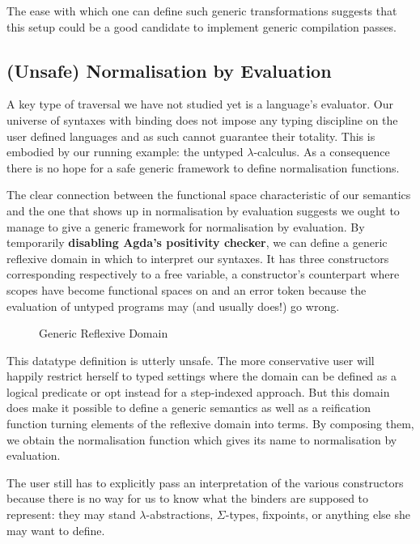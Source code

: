 The ease with which one can define such generic transformations
suggests that this setup could be a good candidate to implement
generic compilation passes.

\subsection{(Unsafe) Normalisation by Evaluation}

A key type of traversal we have not studied yet is a language's
evaluator. Our universe of syntaxes with binding does not impose
any typing discipline on the user defined languages and as such
cannot guarantee their totality. This is embodied by our running
example: the untyped $\lambda$-calculus. As a consequence there
is no hope for a safe generic framework to define normalisation
functions.

The clear connection between the  functional space
characteristic of our semantics and the one that shows up in
normalisation by evaluation suggests we ought to manage to
give a generic framework for normalisation by evaluation.
By temporarily \textbf{disabling Agda's positivity checker},
we can define a generic reflexive domain  in which to
interpret our syntaxes. It has three constructors corresponding
respectively to a free variable, a constructor's counterpart where
scopes have become  functional spaces on  and
an error token because the evaluation of untyped programs may
(and usually does!) go wrong.

\begin{figure}[h]
{\center {}}
\caption{Generic Reflexive Domain}
\end{figure}

This datatype definition is utterly unsafe. The more conservative
user will happily restrict herself to typed settings where the
domain can be defined as a logical predicate or opt instead for
a step-indexed approach. But this domain does make it possible
to define a generic  semantics as well as a reification
function turning elements of the reflexive domain into terms.
By composing them, we obtain the normalisation function which
gives its name to normalisation by evaluation.

The user still has to explicitly pass an interpretation of
the various constructors because there is no way for us to
know what the binders are supposed to represent: they may
stand $\lambda$-abstractions, $\Sigma$-types, fixpoints, or
anything else she may want to define.


